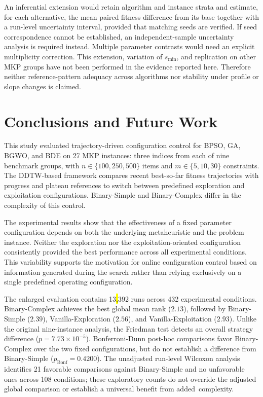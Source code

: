 \documentclass[mathematics,article,accept,moreauthors]{Definitions/mdpi}
\begin{document}
An inferential extension would retain algorithm and instance strata and
estimate, for each alternative, the mean paired fitness difference from its
base together with a run-level uncertainty interval, provided that matching
seeds are verified. If seed correspondence cannot be established, an
independent-sample uncertainty analysis is required instead. Multiple
parameter contrasts would need an explicit multiplicity correction.
This extension, variation of $s_{\min}$, and replication on other MKP groups
have not been performed in the evidence reported here. Therefore neither
reference-pattern adequacy across algorithms nor stability under profile
or slope changes is claimed.


\section{Conclusions and Future Work}
\label{sec:conclusions}

This study evaluated trajectory-driven configuration control for BPSO,
GA, BGWO, and BDE on 27 MKP instances: three indices from each of nine
benchmark groups, with $n\in\{100,250,500\}$ items and
$m\in\{5,10,30\}$ constraints. The DDTW-based framework compares recent
best-so-far fitness trajectories with progress and plateau references to
switch between predefined exploration and exploitation configurations.
Binary-Simple and Binary-Complex differ in the complexity of this control.

The experimental results show that the effectiveness of a fixed parameter
configuration depends on both the underlying metaheuristic and the problem
instance. Neither the exploration nor the exploitation-oriented
configuration consistently provided the best performance across all
experimental conditions. This variability supports the motivation for
online configuration control based on information generated during the
search rather than relying exclusively on a single predefined operating
configuration.

The enlarged evaluation contains 13\hl{,}392 %
 runs across 432 experimental
conditions. Binary-Complex achieves the best global mean rank ($2.13$),
followed by Binary-Simple ($2.39$), Vanilla-Exploration ($2.56$), and
Vanilla-Exploitation ($2.93$). Unlike the original nine-instance analysis,
the Friedman test detects an overall strategy difference
\mbox{($p=7.73\times10^{-5}$).} Bonferroni-Dunn post-hoc comparisons favor
Binary-Complex over the two fixed configurations, but do not establish a
difference from Binary-Simple ($p_{\mathrm{Bonf}}=0.4200$).
The unadjusted run-level Wilcoxon analysis identifies 21 favorable
comparisons against Binary-Simple and no unfavorable ones across 108
conditions; these exploratory counts do not override the adjusted
global comparison or establish a universal benefit from \mbox{added complexity.}
\end{document}
